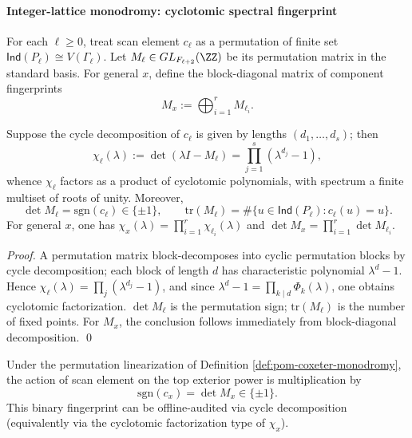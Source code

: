 \paragraph{Integer-lattice monodromy: cyclotomic spectral fingerprint}

\begin{definition}\label{def:pom-coxeter-monodromy}
For each \(\ell\ge 0\), treat scan element \(c_\ell\) as a permutation of finite set \(\mathsf{Ind}(P_\ell)\cong V(\Gamma_\ell)\).
Let \(M_\ell\in GL_{F_{\ell+2}}(\ZZ)\) be its permutation matrix in the standard basis.
For general \(x\), define the block-diagonal matrix of component fingerprints
\[
M_x:=\bigoplus_{i=1}^r M_{\ell_i}.
\]
\end{definition}

\begin{theorem}\label{thm:pom-coxeter-monodromy-cyclotomic}
Suppose the cycle decomposition of \(c_\ell\) is given by lengths \((d_1,\dots,d_s)\); then
\[
\chi_\ell(\lambda):=\det(\lambda I-M_\ell)=\prod_{j=1}^s (\lambda^{d_j}-1),
\]
whence \(\chi_\ell\) factors as a product of cyclotomic polynomials, with spectrum a finite multiset of roots of unity.
Moreover,
\[
\det M_\ell=\mathrm{sgn}(c_\ell)\in\{\pm 1\},\qquad
\mathrm{tr}(M_\ell)=\#\{u\in \mathsf{Ind}(P_\ell): c_\ell(u)=u\}.
\]
For general \(x\), one has \(\chi_x(\lambda)=\prod_{i=1}^r \chi_{\ell_i}(\lambda)\) and \(\det M_x=\prod_{i=1}^r \det M_{\ell_i}\).
\end{theorem}
\begin{proof}
A permutation matrix block-decomposes into cyclic permutation blocks by cycle decomposition; each block of length \(d\) has characteristic polynomial \(\lambda^d-1\).
Hence \(\chi_\ell(\lambda)=\prod_j(\lambda^{d_j}-1)\), and since \(\lambda^d-1=\prod_{k\mid d}\Phi_k(\lambda)\), one obtains cyclotomic factorization.
\(\det M_\ell\) is the permutation sign; \(\mathrm{tr}(M_\ell)\) is the number of fixed points.
For \(M_x\), the conclusion follows immediately from block-diagonal decomposition. \qed
\end{proof}

\begin{corollary}\label{cor:pom-coxeter-top-sign}
Under the permutation linearization of Definition \ref{def:pom-coxeter-monodromy}, the action of scan element on the top exterior power is multiplication by
\[
\mathrm{sgn}(c_x)=\det M_x\in\{\pm 1\}.
\]
This binary fingerprint can be offline-audited via cycle decomposition (equivalently via the cyclotomic factorization type of \(\chi_x\)).
\end{corollary}

